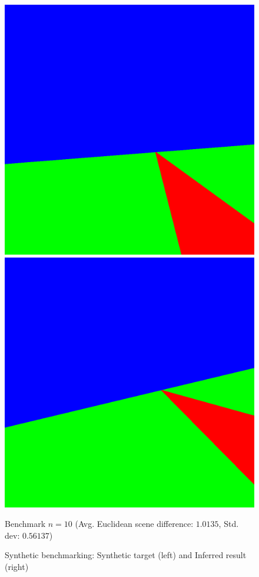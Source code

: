 \documentclass[conference]{IEEEtran}
\begin{document}
\begin{figure}[h]
    \begin{center}
    \begin{minipage}{.49\linewidth}
        \includegraphics[width=\textwidth]{images/SyntheticInput.png}    
    \end{minipage}\hfill%
    \begin{minipage}{.49\linewidth}
        \includegraphics[width=\textwidth]{images/SyntheticOutput.png}
    \end{minipage}
    \end{center}
    \vspace{2mm}
    Benchmark $n=10$ (Avg. Euclidean scene difference: $1.0135$, Std. dev: $0.56137$)
    \caption{Synthetic benchmarking: Synthetic target (left) and Inferred result (right)}
    \label{fig:synthetic}
\end{figure}
\end{document}
